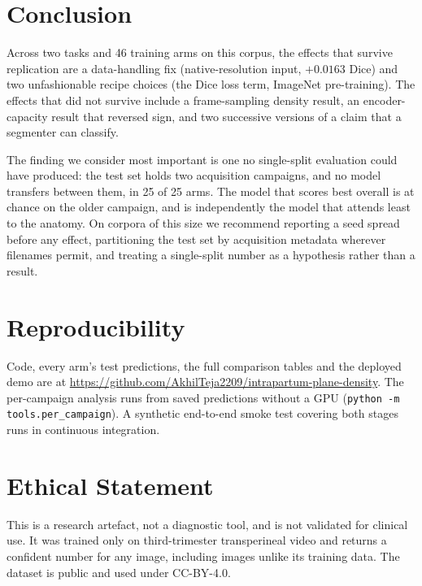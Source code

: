 \documentclass[conference]{IEEEtran}
\begin{document}
\section{Conclusion}

Across two tasks and 46 training arms on this corpus, the effects that survive
replication are a data-handling fix (native-resolution input, $+0.0163$ Dice)
and two unfashionable recipe choices (the Dice loss term, ImageNet
pre-training). The effects that did not survive include a frame-sampling
density result, an encoder-capacity result that reversed sign, and two
successive versions of a claim that a segmenter can classify.

The finding we consider most important is one no single-split evaluation could
have produced: the test set holds two acquisition campaigns, and no model
transfers between them, in 25 of 25 arms. The model that scores best overall is
at chance on the older campaign, and is independently the model that attends
least to the anatomy. On corpora of this size we recommend reporting a seed
spread before any effect, partitioning the test set by acquisition metadata
wherever filenames permit, and treating a single-split number as a hypothesis
rather than a result.

\section*{Reproducibility}

Code, every arm's test predictions, the full comparison tables and the deployed
demo are at
\url{https://github.com/AkhilTeja2209/intrapartum-plane-density}. The
per-campaign analysis runs from saved predictions without a GPU
(\texttt{python -m tools.per\_campaign}). A synthetic end-to-end smoke test
covering both stages runs in continuous integration.

\section*{Ethical Statement}

This is a research artefact, not a diagnostic tool, and is not validated for
clinical use. It was trained only on third-trimester transperineal video and
returns a confident number for any image, including images unlike its training
data. The dataset is public and used under CC-BY-4.0.
\end{document}

